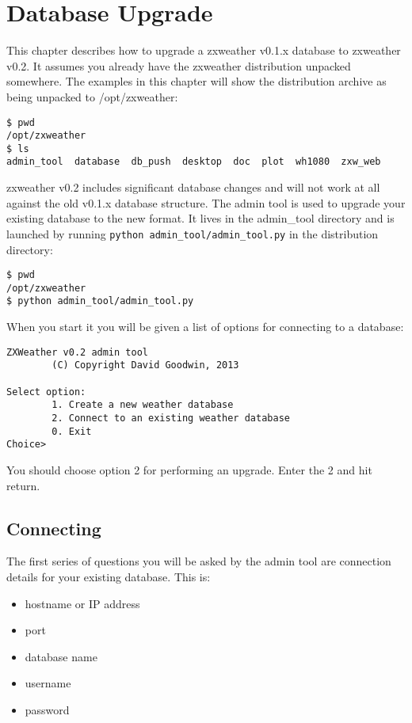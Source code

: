 \documentclass[a4paper,10pt,draft]{book}
\begin{document}
\chapter{Database Upgrade}
\label{cha_database}
This chapter describes how to upgrade a zxweather v0.1.x database to zxweather v0.2. It assumes you already have the zxweather distribution unpacked somewhere. The examples in this chapter will show the distribution archive as being unpacked to /opt/zxweather:
\begin{verbatim}
$ pwd
/opt/zxweather
$ ls
admin_tool  database  db_push  desktop  doc  plot  wh1080  zxw_web
\end{verbatim}

zxweather v0.2 includes significant database changes and will not work at all against the old v0.1.x database structure. The admin tool is used to upgrade your existing database to the new format. It lives in the admin\_tool directory and is launched by running \verb|python admin_tool/admin_tool.py| in the distribution directory:

\begin{verbatim}
$ pwd
/opt/zxweather
$ python admin_tool/admin_tool.py
\end{verbatim}

When you start it you will be given a list of options for connecting to a database:
\begin{verbatim}
ZXWeather v0.2 admin tool
        (C) Copyright David Goodwin, 2013

Select option:
        1. Create a new weather database
        2. Connect to an existing weather database
        0. Exit
Choice>
\end{verbatim}

You should choose option 2 for performing an upgrade. Enter the 2 and hit return.

\section{Connecting}
The first series of questions you will be asked by the admin tool are connection details for your existing database. This is:
\begin{itemize}
\item hostname or IP address
\item port
\item database name
\item username
\item password
\end{itemize}
\end{document}
